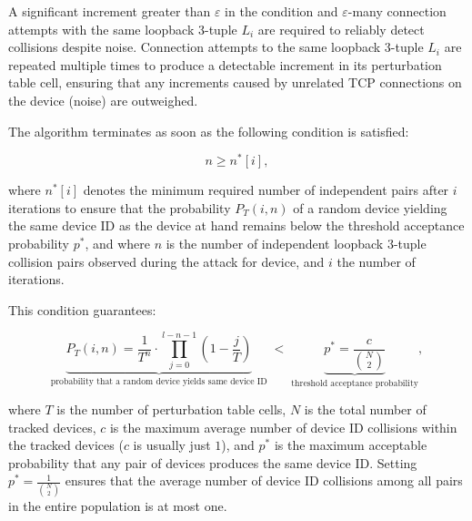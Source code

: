 \documentclass[twocolumn]{report}
\begin{document}
A significant increment greater than \(\varepsilon\) in the condition and \(\varepsilon\)-many connection attempts with the same loopback 3-tuple \(L_i\) are required to reliably detect collisions despite \alert{noise}. Connection attempts to the same loopback 3-tuple \(L_i\) are repeated \alert{multiple times} to produce a detectable increment in its perturbation table cell, ensuring that any increments caused by unrelated TCP connections on the device (noise) are outweighed.

The algorithm \alert{terminates} as soon as the following condition is satisfied:

\vspace{-0.2cm}
\begin{minipage}{\columnwidth}
	\[
		n \ge n^*[i],
	\]
\end{minipage}

where \( n^*[i] \) denotes the \alert{minimum required number of independent pairs} after \( i \) \alert{iterations} to ensure that the \alert{probability} \( P_T(i, n) \) of a random device yielding the same device ID as the device at hand remains below the \alert{threshold acceptance probability} \( p^* \), and where \( n \) is the \alert{number of independent loopback 3-tuple collision pairs} observed during the attack for device, and \( i \) the \alert{number of iterations}.

This condition guarantees:
\vspace{-1cm}
\begin{center}
    \begin{adjustbox}{max width=\columnwidth}
        \begin{minipage}[t]{0.5\textwidth}
            \[
                \underbrace{
                P_T(i, n)
                =
                \frac{1}{T^n}
                \cdot
                \prod_{j=0}^{l - n - 1}
                \left(1 - \frac{j}{T}\right)
                }_{\text{probability that a random device yields same device ID}}
                \;<\;
                \underbrace{
                p^* = \frac{c}{\binom{N}{2}}
                }_{\text{threshold acceptance probability}},
            \]
        \end{minipage}
    \end{adjustbox}
\end{center}

where \( T \) is the \alert{number of perturbation table cells}, \( N \) is the \alert{total number of tracked devices}, \( c \) is the \alert{maximum average number of device ID collisions} within the tracked devices ($c$ is usually just $1$), and \( p^* \) is the \alert{maximum acceptable probability} that any pair of devices produces the same device ID. Setting \( p^* = \frac{1}{\binom{N}{2}} \) ensures that the average number of device ID collisions among all pairs in the entire population is \alert{at most one}.
\end{document}
